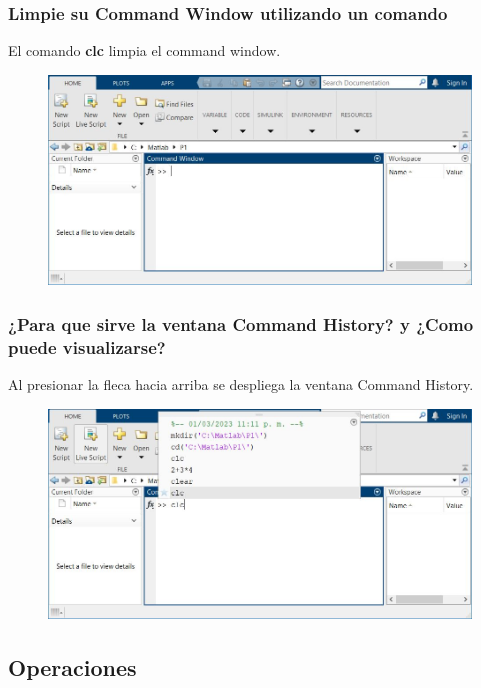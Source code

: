 \documentclass{article}
\begin{document}
\subsubsection{Limpie su Command Window utilizando un comando}

El comando \textbf{clc} limpia el command window.

\begin{figure}[H]
    \centering
    \includegraphics[width=18cm]{img4.jpg}
\end{figure}

\subsubsection{¿Para que sirve la ventana Command History? y ¿Como puede visualizarse?}

Al presionar la fleca hacia arriba se despliega la ventana Command History.

\begin{figure}[H]
    \centering
    \includegraphics[width=18cm]{img5.jpg}
\end{figure}

\subsection{Operaciones}
\end{document}

